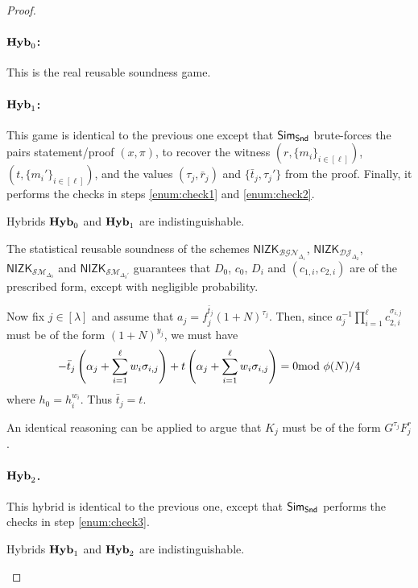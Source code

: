 \begin{proof}
\paragraph{$\mathsf{\mathbf{Hyb}}_0$:} This is the real reusable soundness game.

\paragraph{$\mathsf{\mathbf{Hyb}}_1$:}  This game is identical to the previous one except that $\mathsf{Sim}_\mathsf{Snd}$ brute-forces the pairs statement/proof $(x,\pi)$, to recover the witness $(r,\{m_i\}_{i\in [\ell]})$, $(t,\{m_i'\}_{i\in [\ell]})$, and the values $(\tau_j,\bar r_j)$ and $\{\bar t_{j},\tau_{j}'\}$ from the proof. Finally, it performs the checks in steps \ref{enum:check1} and \ref{enum:check2}.

\begin{claim}
Hybrids $\mathsf{\mathbf{Hyb}}_0$ and $\mathsf{\mathbf{Hyb}}_1$ are indistinguishable.
\end{claim}


The statistical reusable soundness of the schemes $\mathsf{NIZK}_{\mathcal{BGN}_{\Delta_1}}$, $\mathsf{NIZK}_{\mathcal{DJ}_{\Delta_2}}$, $\mathsf{NIZK}_{\mathcal{SM}_{\Delta_3}}$ and $\mathsf{NIZK}_{\mathcal{SM}_{\Delta_3'}}$ guarantees that $D_0$, $c_0$, $D_i$ and $(c_{1,i},c_{2,i})$ are of the prescribed form, except with negligible probability. 


Now fix $j\in [\lambda]$ and assume that $a_j=f_j^{\bar t_j}(1+N)^{\tau_{j}}$. Then, since $a_{j}^{-1}\prod_{i=1}^\ell c_{2,i}^{\sigma_{i,j}}$ must be of the form $(1+N)^{y_{j}}$, we must have $$-\bar t_{j}\left(\alpha_j+\sum_{i=1}^\ell w_{i}\sigma_{i,j}\right)+t\left(\alpha_j+\sum_{i=1}^\ell w_i\sigma_{i,j}\right)=0\!\!\!\!\mod \phi(N)/4$$ where $h_0=h_i^{w_i}$. Thus $\bar t_j=t$.

An identical reasoning can be applied to argue that $K_j$ must be of the form $G^{\tau_j} F_j^r$.




\paragraph{$\mathsf{\mathbf{Hyb}}_2$.} This hybrid is identical to the previous one, except that $\mathsf{Sim}_\mathsf{Snd}$ performs the checks in step \ref{enum:check3}.

\begin{claim}
Hybrids $\mathsf{\mathbf{Hyb}}_1$ and $\mathsf{\mathbf{Hyb}}_2$ are indistinguishable.
\end{claim}


\end{proof}
